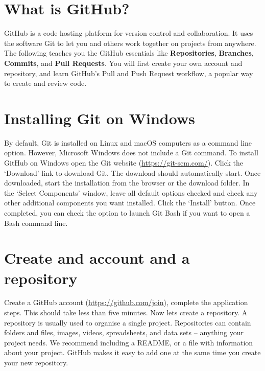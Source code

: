 \documentclass[
]{book}
\begin{document}
\hypertarget{what-is-github}{%
\section{What is GitHub?}\label{what-is-github}}

GitHub is a code hosting platform for version control and collaboration. It uses the software Git to let you and others work together on projects from anywhere. The following teaches you the GitHub essentials like \textbf{Repositories}, \textbf{Branches}, \textbf{Commits}, and \textbf{Pull Requests}. You will first create your own account and repository, and learn GitHub's Pull and Push Request workflow, a popular way to create and review code.

\hypertarget{installing-git-on-windows}{%
\section{Installing Git on Windows}\label{installing-git-on-windows}}

By default, Git is installed on Linux and macOS computers as a command line option. However, Microsoft Windows does not include a Git command. To install GitHub on Windows open the Git website (\url{https://git-scm.com/}). Click the `Download' link to download Git. The download should automatically start. Once downloaded, start the installation from the browser or the download folder. In the `Select Components' window, leave all default options checked and check any other additional components you want installed. Click the `Install' button. Once completed, you can check the option to launch Git Bash if you want to open a Bash command line.

\hypertarget{create-and-account-and-a-repository}{%
\section{Create and account and a repository}\label{create-and-account-and-a-repository}}

Create a GitHub account (\url{https://github.com/join}), complete the application steps. This should take less than five minutes. Now lets create a repository. A repository is usually used to organise a single project. Repositories can contain folders and files, images, videos, spreadsheets, and data sets -- anything your project needs. We recommend including a README, or a file with information about your project. GitHub makes it easy to add one at the same time you create your new repository.
\end{document}
